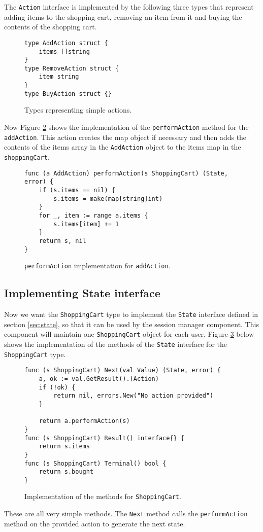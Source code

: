 The \texttt{Action} interface is implemented by the following three types
that represent adding items to the shopping cart, removing an item from it
and buying the contents of the shopping cart.
\begin{figure}[h]
\begin{lstlisting}
type AddAction struct {
    items []string
}
type RemoveAction struct {
    item string
}
type BuyAction struct {}
\end{lstlisting}
\caption[scale=1.0]{Types representing simple actions.}
\label{fig:actions}
\end{figure}

Now Figure \ref{fig:addAction} shows the implementation of the \texttt{performAction}
method for the \texttt{addAction}. This action creates the map object if 
necessary and then adds the contents of the items array in the \texttt{AddAction}
object to the items map in the \texttt{shoppingCart}.
\begin{figure}[h]
\begin{lstlisting}
func (a AddAction) performAction(s ShoppingCart) (State, error) {
    if (s.items == nil) {
        s.items = make(map[string]int)
    }
    for _, item := range a.items {
        s.items[item] += 1
    }
    return s, nil
}
\end{lstlisting}
\caption[scale=1.0]{\texttt{performAction} implementation for \texttt{addAction}.}
\label{fig:addAction}
\end{figure}

\subsection{Implementing State interface}
Now we want the \texttt{ShoppingCart} type to implement the \texttt{State} 
interface defined in section
\ref{sec:state}, so that it can be used by the session manager component.
This component will maintain one \texttt{ShoppingCart} object for each user.
Figure \ref{fig:shoppingCartImpl} below shows the implementation of the 
methods of the \texttt{State} interface for the \texttt{ShoppingCart} type.
\begin{figure}[h]
\begin{lstlisting}
func (s ShoppingCart) Next(val Value) (State, error) {
    a, ok := val.GetResult().(Action)
    if (!ok) {
        return nil, errors.New("No action provided")
    }

    return a.performAction(s)
}
func (s ShoppingCart) Result() interface{} {
    return s.items
}
func (s ShoppingCart) Terminal() bool {
    return s.bought
}
\end{lstlisting}
\caption[scale=1.0]{Implementation of the methods for \texttt{ShoppingCart}.}
\label{fig:shoppingCartImpl}
\end{figure}
These are all very simple methods. The \texttt{Next} method calls 
the \texttt{performAction} method on the provided action to generate 
the next state.

